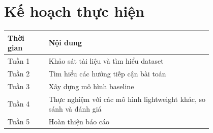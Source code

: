 \section{Kế hoạch thực hiện}
\label{planning}

\begin{center}
\label{tab:schedule}
\renewcommand{\arraystretch}{1.5}
\begin{tabular}{@{}l p{0.8\linewidth}@{}}
\toprule
\textbf{Thời gian} & \textbf{Nội dung} \\
\midrule
Tuần 1 & Khảo sát tài liệu và tìm hiểu dataset \\
Tuần 2 & Tìm hiểu các hướng tiếp cận bài toán \\
Tuần 3 & Xây dựng mô hình baseline \\
Tuần 4 & Thực nghiệm với các mô hình lightweight khác, so sánh và đánh giá \\
Tuần 5 & Hoàn thiện báo cáo \\
\bottomrule
\end{tabular}
\end{center}
